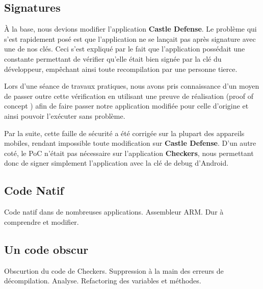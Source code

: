 \subsection{Signatures}

À la base, nous devions modifier l'application \textbf{Castle Defense}.
Le problème qui s'est rapidement posé est que l'application ne se lançait pas après signature avec une de nos clés.
Ceci s'est expliqué par le fait que l'application possédait une constante permettant de vérifier qu'elle était bien signée par la clé du développeur,
empêchant ainsi toute recompilation par une personne tierce.

Lors d'une séance de travaux pratiques, nous avons pris connaissance d'un moyen de passer outre cette vérification en utilisant une preuve de réalisation
(proof of concept \cite{PoC}) afin de faire passer notre application modifiée pour celle d'origine et ainsi pouvoir l'exécuter sans problème.

Par la suite, cette faille de sécurité a été corrigée sur la plupart des appareils mobiles,
rendant impossible toute modification sur \textbf{Castle Defense}.
D'un autre coté, le PoC n'était pas nécessaire sur l'application \textbf{Checkers},
nous permettant donc de signer simplement l'application avec la clé de debug d'Android.


\subsection{Code Natif}

Code natif dans de nombreuses applications.
Assembleur ARM.
Dur à comprendre et modifier.


\subsection{Un code obscur}

Obscurtion du code de Checkers.
Suppression à la main des erreurs de décompilation.
Analyse.
Refactoring des variables et méthodes.

